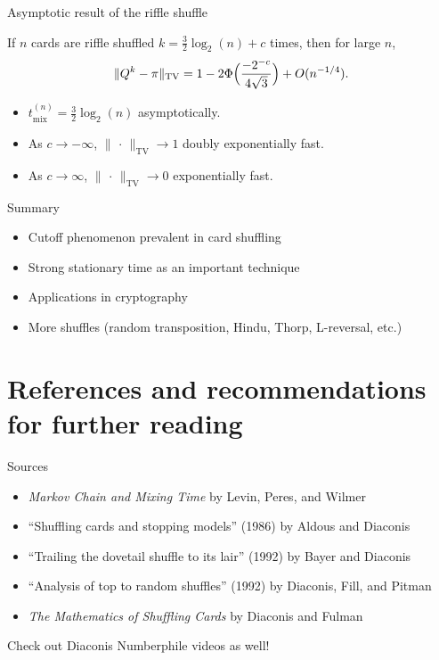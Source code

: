 \documentclass[10pt]{beamer}
\newcommand{\blank}{\,\cdot\,}
\newcommand{\nm}[1]{\lVert #1 \rVert_\mathrm{TV}}
\newcommand{\tmix}{t_\mathrm{mix}}
\begin{document}

\begin{frame}{Asymptotic result of the riffle shuffle}
    \begin{theorem}
        If $n$ cards are riffle shuffled $k = \frac{3}{2}\log_2(n) + c$ times, then for large $n$, \[
            \nm{Q^k - \pi} = 1 - 2\Phi\Bigl(\frac{-2^{-c}}{4\sqrt{3}}\Bigr) + O(n^{-1/4}).
        \]
    \end{theorem}
    \begin{itemize}
        \item $\tmix^{(n)} = \frac{3}{2}\log_2(n)$ asymptotically.
        \item As $c \to -\infty$, $\nm{\blank} \to 1$ doubly exponentially fast.
        \item As $c \to \infty$, $\nm{\blank} \to 0$ exponentially fast.
    \end{itemize}
\end{frame}

\begin{frame}{Summary}
    \begin{itemize}
        \item Cutoff phenomenon prevalent in card shuffling
        \item Strong stationary time as an important technique
        \item Applications in cryptography
        \item More shuffles (random transposition, Hindu, Thorp, L-reversal, etc.)
    \end{itemize}
\end{frame}

\section{References and recommendations for further reading}
\begin{frame}{Sources}
\begin{itemize}
    \item \textit{Markov Chain and Mixing Time} by Levin, Peres, and Wilmer
    \item ``Shuffling cards and stopping models'' (1986) by Aldous and Diaconis
    \item ``Trailing the dovetail shuffle to its lair'' (1992) by Bayer and Diaconis
    \item ``Analysis of top to random shuffles'' (1992) by Diaconis, Fill, and Pitman
    \item \textit{The Mathematics of Shuffling Cards} by Diaconis and Fulman
\end{itemize}

Check out Diaconis Numberphile videos as well!
\end{frame}
\end{document}
